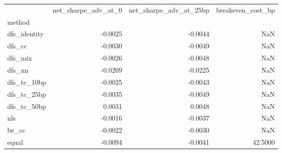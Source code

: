 \begin{tabular}{lrrr}
\toprule
 & net_sharpe_adv_at_0 & net_sharpe_adv_at_25bp & breakeven_cost_bp \\
method &  &  &  \\
\midrule
dfs_identity & -0.0025 & -0.0044 & NaN \\
dfs_cc & -0.0030 & -0.0049 & NaN \\
dfs_mix & -0.0026 & -0.0048 & NaN \\
dfs_nn & -0.0209 & -0.0225 & NaN \\
dfs_tc_10bp & -0.0025 & -0.0043 & NaN \\
dfs_tc_25bp & -0.0035 & -0.0049 & NaN \\
dfs_tc_50bp & 0.0031 & 0.0048 & NaN \\
nls & -0.0016 & -0.0037 & NaN \\
lw_cc & -0.0022 & -0.0030 & NaN \\
equal & -0.0094 & -0.0041 & 42.5000 \\
\bottomrule
\end{tabular}
